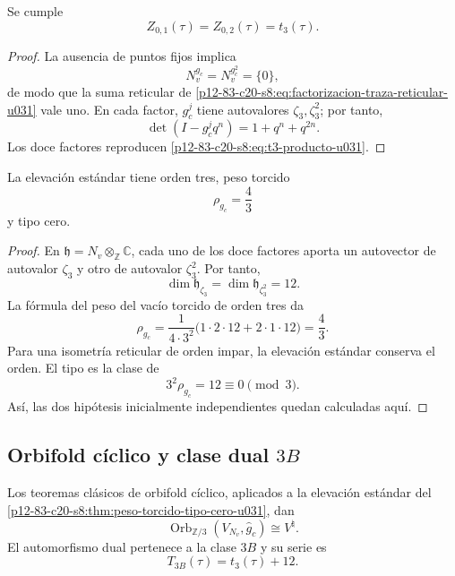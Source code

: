 \begin{proposition}
\label{p12-83-c20-s8:prop:traza-reticular-t3-u031}
Se cumple
\[
 Z_{0,1}(\tau)=Z_{0,2}(\tau)=t_3(\tau).
\]
\end{proposition}

\begin{proof}
La ausencia de puntos fijos implica
\[
 N_v^{g_c}=N_v^{g_c^2}=\{0\},
\]
de modo que la suma reticular de
\eqref{p12-83-c20-s8:eq:factorizacion-traza-reticular-u031} vale uno. En cada factor,
\(g_c^j\) tiene autovalores \(\zeta_3,\zeta_3^2\); por tanto,
\[
 \det(I-g_c^jq^n)=1+q^n+q^{2n}.
\]
Los doce factores reproducen \eqref{p12-83-c20-s8:eq:t3-producto-u031}.
\end{proof}

\begin{theorem}
\label{p12-83-c20-s8:thm:peso-torcido-tipo-cero-u031}
La elevación estándar tiene orden tres, peso torcido
\begin{equation}
 \rho_{g_c}=\frac43
 \label{p12-83-c20-s8:eq:peso-torcido-u031}
\end{equation}
y tipo cero.
\end{theorem}

\begin{proof}
En
\(\mathfrak h=N_v\otimes_{\mathbb Z}\mathbb C\), cada uno de los doce
factores aporta un autovector de autovalor \(\zeta_3\) y otro de autovalor
\(\zeta_3^2\). Por tanto,
\[
 \dim\mathfrak h_{\zeta_3}
 =\dim\mathfrak h_{\zeta_3^2}=12.
\]
La fórmula del peso del vacío torcido de orden tres da
\[
 \rho_{g_c}
 =\frac1{4\cdot3^2}
 \bigl(1\cdot2\cdot12+2\cdot1\cdot12\bigr)
 =\frac43.
\]
Para una isometría reticular de orden impar, la elevación estándar conserva
el orden. El tipo es la clase de
\[
 3^2\rho_{g_c}=12\equiv0\pmod3.
\]
Así, las dos hipótesis inicialmente independientes quedan calculadas aquí.
\end{proof}

\subsection{Orbifold cíclico y clase dual \texorpdfstring{\(3B\)}{3B}}

\begin{theorem}
\label{p12-83-c20-s8:thm:orbifold-triadico-vnatural-u031}
Los teoremas clásicos de orbifold cíclico, aplicados a la elevación estándar
del \cref{p12-83-c20-s8:thm:peso-torcido-tipo-cero-u031}, dan
\begin{equation}
 \operatorname{Orb}_{\mathbb Z/3}
 (V_{N_v},\widehat g_c)
 \cong V^\natural.
 \label{p12-83-c20-s8:eq:orbifold-triadico-vnatural-u031}
\end{equation}
El automorfismo dual pertenece a la clase \(3B\) y su serie es
\begin{equation}
 T_{3B}(\tau)=t_3(\tau)+12.
 \label{p12-83-c20-s8:eq:serie-3b-u031}
\end{equation}
\end{theorem}

